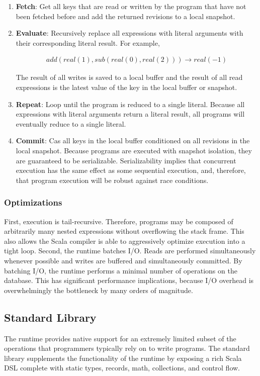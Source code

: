 \documentclass[../main.tex]{subfiles}
\begin{document}
    \begin{enumerate}
    \item \textbf{Fetch}: Get all keys that are read or written by the program that have not been
    fetched before and add the returned revisions to a local snapshot.
    \item \textbf{Evaluate}: Recursively replace all expressions with literal arguments with their
    corresponding literal result. For example,

    \[
    \begin{gathered}
    add(real(1), sub(real(0), real(2))) \rightarrow real(-1)
    \end{gathered}
    \]

    The result of all writes is saved to a local buffer and the result of all read
    expressions is the latest value of the key in the local buffer or snapshot.
    \item \textbf{Repeat}: Loop until the program is reduced to a single literal. Because all
    expressions with literal arguments return a literal result, all programs will eventually
    reduce to a single literal.
    \item \textbf{Commit}: Cas all keys in the local buffer conditioned on all revisions in
    the local snapshot. Because programs are executed with snapshot isolation, they are
    guaranteed to be serializable. Serializability implies that concurrent execution has the
    same effect as some sequential execution, and, therefore, that program execution will be
    robust against race conditions.
    \end{enumerate}

    \subsubsection{Optimizations}
    First, execution is tail-recursive. Therefore, programs may be composed of arbitrarily many
    nested expressions without overflowing the stack frame. This also allows the Scala compiler is
    able to aggressively optimize execution into a tight loop. Second, the runtime batches I/O.
    Reads are performed simultaneously whenever possible and writes are buffered and simultaneously
    committed. By batching I/O, the runtime performs a minimal number of operations on the database.
    This has significant performance implications, because I/O overhead is overwhelmingly the
    bottleneck by many orders of magnitude. \cite{io}

  \subsection{Standard Library}
  The runtime provides native support for an extremely limited subset of the operations that
  programmers typically rely on to write programs. The standard library supplements the
  functionality of the runtime by exposing a rich Scala DSL complete with static types, records,
  math, collections, and control flow.
\end{document}
